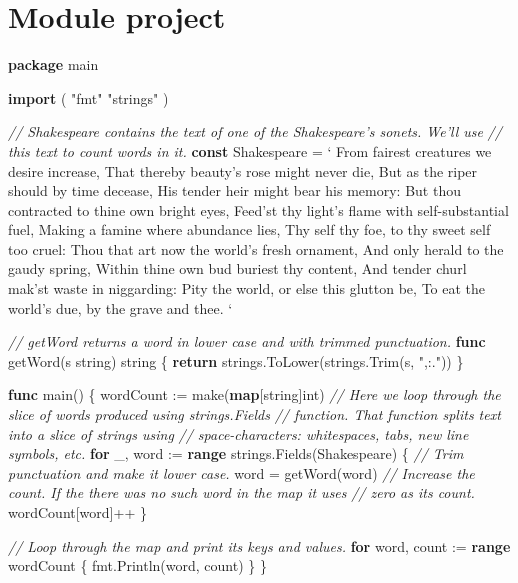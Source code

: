 \documentclass[]{book}
\newenvironment{Shaded}{\begin{snugshade}}{\end{snugshade}}
\newcommand{\BuiltInTok}[1]{#1}
\newcommand{\CommentTok}[1]{\textcolor[rgb]{0.56,0.35,0.01}{\textit{#1}}}
\newcommand{\DataTypeTok}[1]{\textcolor[rgb]{0.13,0.29,0.53}{#1}}
\newcommand{\KeywordTok}[1]{\textcolor[rgb]{0.13,0.29,0.53}{\textbf{#1}}}
\newcommand{\NormalTok}[1]{#1}
\newcommand{\StringTok}[1]{\textcolor[rgb]{0.31,0.60,0.02}{#1}}
\begin{document}
\hypertarget{module-project-1}{%
\section*{Module project}\label{module-project-1}}

\begin{Shaded}
\begin{Highlighting}[]
\KeywordTok{package}\NormalTok{ main}

\KeywordTok{import}\NormalTok{ (}
    \StringTok{"fmt"}
    \StringTok{"strings"}
\NormalTok{)}

\CommentTok{// Shakespeare contains the text of one of the Shakespeare's sonets. We'll use}
\CommentTok{// this text to count words in it.}
\KeywordTok{const}\NormalTok{ Shakespeare = }\StringTok{`}
\StringTok{From fairest creatures we desire increase,}
\StringTok{That thereby beauty's rose might never die,}
\StringTok{But as the riper should by time decease,}
\StringTok{His tender heir might bear his memory:}
\StringTok{But thou contracted to thine own bright eyes,}
\StringTok{Feed'st thy light's flame with self-substantial fuel,}
\StringTok{Making a famine where abundance lies,}
\StringTok{Thy self thy foe, to thy sweet self too cruel:}
\StringTok{Thou that art now the world's fresh ornament,}
\StringTok{And only herald to the gaudy spring,}
\StringTok{Within thine own bud buriest thy content,}
\StringTok{And tender churl mak'st waste in niggarding:}
\StringTok{  Pity the world, or else this glutton be,}
\StringTok{  To eat the world's due, by the grave and thee.}
\StringTok{`}

\CommentTok{// getWord returns a word in lower case and with trimmed punctuation.}
\KeywordTok{func}\NormalTok{ getWord(s }\DataTypeTok{string}\NormalTok{) }\DataTypeTok{string}\NormalTok{ \{}
    \KeywordTok{return}\NormalTok{ strings.ToLower(strings.Trim(s, }\StringTok{",:."}\NormalTok{))}
\NormalTok{\}}

\KeywordTok{func}\NormalTok{ main() \{}
\NormalTok{    wordCount := }\BuiltInTok{make}\NormalTok{(}\KeywordTok{map}\NormalTok{[}\DataTypeTok{string}\NormalTok{]}\DataTypeTok{int}\NormalTok{)}
    \CommentTok{// Here we loop through the slice of words produced using strings.Fields}
    \CommentTok{// function. That function splits text into a slice of strings using}
    \CommentTok{// space-characters: whitespaces, tabs, new line symbols, etc.}
    \KeywordTok{for}\NormalTok{ _, word := }\KeywordTok{range}\NormalTok{ strings.Fields(Shakespeare) \{}
        \CommentTok{// Trim punctuation and make it lower case.}
\NormalTok{        word = getWord(word)}
        \CommentTok{// Increase the count. If the there was no such word in the map it uses}
        \CommentTok{// zero as its count.}
\NormalTok{        wordCount[word]++}
\NormalTok{    \}}

    \CommentTok{// Loop through the map and print its keys and values.}
    \KeywordTok{for}\NormalTok{ word, count := }\KeywordTok{range}\NormalTok{ wordCount \{}
\NormalTok{        fmt.Println(word, count)}
\NormalTok{    \}}
\NormalTok{\}}
\end{Highlighting}
\end{Shaded}
\end{document}
